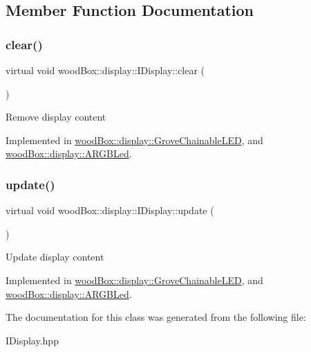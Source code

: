 \subsection{Member Function Documentation}
\mbox{\label{classwood_box_1_1display_1_1_i_display_a7030f0768c1ef15ce936a259406168dc}} 
\subsubsection{\texorpdfstring{clear()}{clear()}}
{\footnotesize\ttfamily virtual void wood\+Box\+::display\+::\+I\+Display\+::clear (\begin{DoxyParamCaption}{ }\end{DoxyParamCaption})\hspace{0.3cm}{\ttfamily [pure virtual]}}

Remove display content 

Implemented in \mbox{\hyperlink{classwood_box_1_1display_1_1_grove_chainable_l_e_d_a1c42c42ee9643aa914ab20a191e4adfd}{wood\+Box\+::display\+::\+Grove\+Chainable\+L\+ED}}, and \mbox{\hyperlink{classwood_box_1_1display_1_1_a_r_g_b_led_a01eeaee1bbb439e81f5f9bc536c04df7}{wood\+Box\+::display\+::\+A\+R\+G\+B\+Led}}.

\mbox{\label{classwood_box_1_1display_1_1_i_display_ad8c0811b8b807ce119a06c7806004de7}} 
\subsubsection{\texorpdfstring{update()}{update()}}
{\footnotesize\ttfamily virtual void wood\+Box\+::display\+::\+I\+Display\+::update (\begin{DoxyParamCaption}{ }\end{DoxyParamCaption})\hspace{0.3cm}{\ttfamily [pure virtual]}}

Update display content 

Implemented in \mbox{\hyperlink{classwood_box_1_1display_1_1_grove_chainable_l_e_d_a650969665d0b5607465a63159c62e4ef}{wood\+Box\+::display\+::\+Grove\+Chainable\+L\+ED}}, and \mbox{\hyperlink{classwood_box_1_1display_1_1_a_r_g_b_led_ab71f321d91e931f95b96d1f492a9454d}{wood\+Box\+::display\+::\+A\+R\+G\+B\+Led}}.



The documentation for this class was generated from the following file\+:\begin{DoxyCompactItemize}
\item 
I\+Display.\+hpp\end{DoxyCompactItemize}
